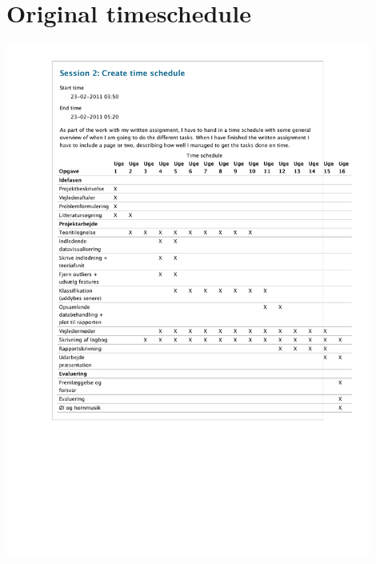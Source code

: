 \clearpage

\section{Original timeschedule} %
\label{app:timeschedule}
\includegraphics[width=120mm]{media/timeschedule.pdf}
